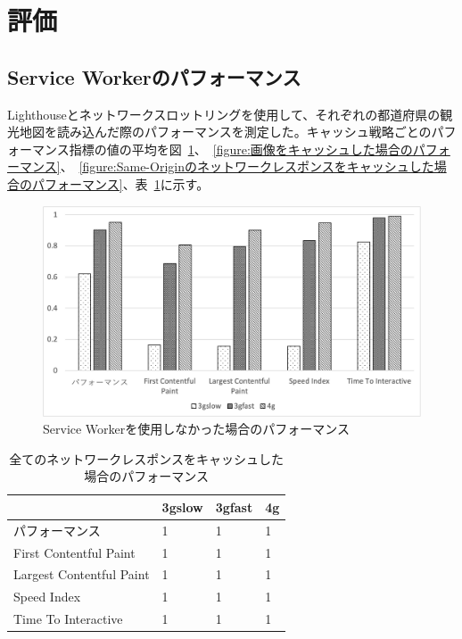 \section{評価}
\label{section:評価}
\subsection{Service Workerのパフォーマンス}
\label{subsection:Service Workerのパフォーマンス}
Lighthouseとネットワークスロットリングを使用して、それぞれの都道府県の観光地図を読み込んだ際のパフォーマンスを測定した。キャッシュ戦略ごとのパフォーマンス指標の値の平均を図~\ref{figure:Service Workerを使用しなかった場合のパフォーマンス}、~\ref{figure:画像をキャッシュした場合のパフォーマンス}、~\ref{figure:Same-Originのネットワークレスポンスをキャッシュした場合のパフォーマンス}、表~\ref{table:全てのネットワークレスポンスをキャッシュした場合のパフォーマンス}に示す。
\begin{figure}
  \centering
  \includegraphics[width=\textwidth]{images/without_service_worker.png}
  \caption{Service Workerを使用しなかった場合のパフォーマンス}\label{figure:Service Workerを使用しなかった場合のパフォーマンス}
\end{figure}
\begin{table}
  \caption{全てのネットワークレスポンスをキャッシュした場合のパフォーマンス}
  \label{table:全てのネットワークレスポンスをキャッシュした場合のパフォーマンス}
  \centering
  \begin{tabular}{|p{15em}|p{5em}|p{5em}|p{5em}|}
    \hline
    & 3gslow & 3gfast & 4g \\ \hline
    パフォーマンス & 1 & 1 & 1 \\ \hline
    First Contentful Paint & 1 & 1 & 1 \\ \hline
    Largest Contentful Paint & 1 & 1 & 1 \\ \hline
    Speed Index & 1 & 1 & 1 \\ \hline
    Time To Interactive & 1 & 1 & 1 \\ \hline
  \end{tabular}
\end{table}
